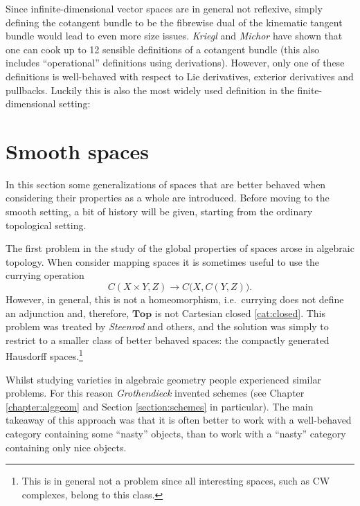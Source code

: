     Since infinite-dimensional vector spaces are in general not reflexive, simply defining the cotangent bundle to be the fibrewise dual of the kinematic tangent bundle would lead to even more size issues. \textit{Kriegl} and \textit{Michor} have shown that one can cook up to 12 sensible definitions of a cotangent bundle (this also includes ``operational'' definitions using derivations). However, only one of these definitions is well-behaved with respect to Lie derivatives, exterior derivatives and pullbacks. Luckily this is also the most widely used definition in the finite-dimensional setting:

\section{Smooth spaces}\label{section:smooth_spaces}

    In this section some generalizations of spaces that are better behaved when considering their properties as a whole are introduced. Before moving to the smooth setting, a bit of history will be given, starting from the ordinary topological setting.

    The first problem in the study of the global properties of spaces arose in algebraic topology. When consider mapping spaces it is sometimes useful to use the currying operation \[C(X\times Y,Z)\rightarrow C\big(X,C(Y,Z)\big).\] However, in general, this is not a homeomorphism, i.e.~currying does not define an adjunction and, therefore, $\mathbf{Top}$ is not Cartesian closed \ref{cat:closed}. This problem was treated by \textit{Steenrod} and others, and the solution was simply to restrict to a smaller class of better behaved spaces: the compactly generated Hausdorff spaces.\footnote{This is in general not a problem since all interesting spaces, such as CW complexes, belong to this class.}

    Whilst studying varieties in algebraic geometry people experienced similar problems. For this reason \textit{Grothendieck} invented schemes (see Chapter \ref{chapter:alggeom} and Section \ref{section:schemes} in particular). The main takeaway of this approach was that it is often better to work with a well-behaved category containing some ``nasty'' objects, than to work with a ``nasty'' category containing only nice objects.

